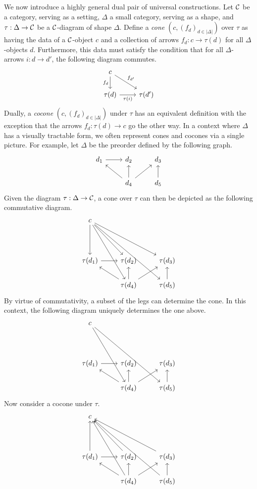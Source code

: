We now introduce a highly general dual pair of universal constructions. Let $\mathcal{C}$ be a category, serving as a setting, $\Delta$ a small category, serving as a shape, and $\tau:\Delta\to\mathcal{C}$ be a $\mathcal{C}$-diagram of shape $\Delta$. Define a \emph{cone} $(c,(f_d)_{d\in|\Delta|})$ over $\tau$ as having the data of a $\mathcal{C}$-object $c$ and a collection of arrows $f_d:c\to \tau(d)$ for all $\Delta$-objects $d$. Furthermore, this data must satisfy the condition that for all $\Delta$-arrows $i:d\to d'$, the following diagram commutes.
\[
\begin{tikzcd}
c \arrow[d,"f_d"'] \arrow[dr,"f_{d'}"] \\
\tau(d) \arrow[r,"\tau(i)"'] & \tau(d')
\end{tikzcd}
\]
Dually, a \emph{cocone} $(c,(f_d)_{d\in|\Delta|})$ under $\tau$ has an equivalent definition with the exception that the arrows $f_d:\tau(d)\to c$ go the other way. In a context where $\Delta$ has a visually tractable form, we often represent cones and cocones via a single picture. For example, let $\Delta$ be the preorder defined by the following graph.
\[
\begin{tikzcd}
d_1 \arrow[r] & d_2 & d_3 \\
& d_4 \arrow[ul] \arrow[u] \arrow[ur] & d_5 \arrow[u]
\end{tikzcd}
\]
Given the diagram $\tau:\Delta\to\mathcal{C}$, a cone over $\tau$ can then be depicted as the following commutative diagram.
\[
\begin{tikzcd} 
c \arrow[dd] \arrow[ddr] \arrow[ddrr] \arrow[dddr] \arrow[dddrr] \\
{} \\
\tau(d_1) \arrow[r] & \tau(d_2) & \tau(d_3) \\
& \tau(d_4) \arrow[ul] \arrow[u] \arrow[ur] & \tau(d_5) \arrow[u]
\end{tikzcd}
\]
By virtue of commutativity, a subset of the legs can determine the cone. In this context, the following diagram uniquely determines the one above.
\[
\begin{tikzcd} 
c \arrow[dddr] \arrow[dddrr] \\
{} \\
\tau(d_1) \arrow[r] & \tau(d_2) & \tau(d_3) \\
& \tau(d_4) \arrow[ul] \arrow[u] \arrow[ur] & \tau(d_5) \arrow[u]
\end{tikzcd}
\]
Now consider a cocone under $\tau$.
\[
\begin{tikzcd} 
c \\
{} \\
\tau(d_1) \arrow[r] \arrow[uu] & \tau(d_2) \arrow[uul] & \tau(d_3) \arrow[uull] \\
& \tau(d_4) \arrow[ul] \arrow[u] \arrow[ur] \arrow[uuul] & \tau(d_5) \arrow[u] \arrow[uuull]
\end{tikzcd}
\]
